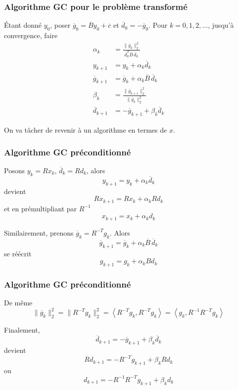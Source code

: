 \documentclass[usepdftitle=false]{beamer}
\begin{document}
\begin{frame}
\frametitle{Algorithme GC pour le problème transformé}


Étant donné $y_0$, poser $\overline{g}_0 = \overline{B}y_0 + \overline{c}$ et $\overline{d}_0 = -\overline{g}_0$.
Pour $k = 0,1,2,\ldots$, jusqu'à convergence, faire
\begin{align*}
\alpha_k &= \frac{\| \overline{g}_k \|^2_2}{\overline{d}_k^T\overline{B}\,\overline{d}_k} \\
y_{k+1} &= y_k + \alpha_k \overline{d}_k \\
\overline{g}_{k+1} &= \overline{g}_k + \alpha_k \overline{B}\, \overline{d}_k \\
\beta_k &= \frac{\| \overline{g}_{k+1} \|^2_2 }{ \| \overline{g}_k \|^2_2 } \\
\overline{d}_{k+1} &= -\overline{g}_{k+1} + \beta_k \overline{d}_k
\end{align*}

\mbox{}

On va tâcher de revenir à un algorithme en termes de $x$.

\end{frame}

\begin{frame}
\frametitle{Algorithme GC préconditionné}

Posons $y_k = Rx_k$, $\overline{d}_k = Rd_k$, alors
$$
y_{k+1} = y_k + \alpha_k \overline{d}_k
$$
devient
$$
Rx_{k+1} = Rx_k + \alpha_k Rd_k
$$
et en prémultipliant par $R^{-1}$
$$
x_{k+1} = x_k + \alpha_k d_k
$$

\mbox{}

Similairement, prenons $\overline{g}_k = R^{-T} g_k$.
Alors
$$
\overline{g}_{k+1} = \overline{g}_k + \alpha_k \overline{B}\, \overline{d}_k
$$
se réécrit
$$
g_{k+1} = g_k + \alpha_k B d_k
$$

\end{frame}

\begin{frame}
\frametitle{Algorithme GC préconditionné}

De même
$$
\| \overline{g}_k \|^2_2
= \| R^{-T}g_k \|^2_2
= \left\langle R^{-T}g_k, R^{-T}g_k \right\rangle
= \left\langle g_k, R^{-1}R^{-T}g_k \right\rangle
$$

\mbox{}

Finalement,
$$
\overline{d}_{k+1} = -\overline{g}_{k+1} + \beta_k \overline{d}_k
$$
devient
$$
Rd_{k+1} = -R^{-T}g_{k+1} + \beta_k Rd_k
$$
ou
$$
d_{k+1} = -R^{-1}R^{-T}g_{k+1} + \beta_k d_k
$$

\end{frame}
\end{document}
